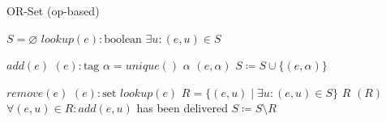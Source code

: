 \begin{algorithm}[t]
\small{
	\caption{OR-Set (op-based)}
 	\label{alg:or_set_op_based}                       

 	\begin{algorithmic}[1]
 	  \State \Payload $S = \varnothing$
 	  \State \Query $lookup(e) : \text{boolean}$
 	  \State \hspace{\algorithmicindent} \Return $\exists u : (e, u) \in S$
 	  
 	  \State \Update $add(e)$
 	  \State \hspace{\algorithmicindent} \Prepare $(e) : \text{tag}$
 	  \State \hspace{\algorithmicindent}\hspace{\algorithmicindent} \Let $\alpha = unique()$
 	  \State \hspace{\algorithmicindent}\hspace{\algorithmicindent} \Return $\alpha$
 	  \State \hspace{\algorithmicindent} \Effect $(e, \alpha)$ 
 	  \State \hspace{\algorithmicindent}\hspace{\algorithmicindent} $S \coloneqq S \cup \{(e, \alpha)\}$
 	  
 	  \State \Update $remove(e)$
 	  \State \hspace{\algorithmicindent} \Prepare $(e) : \text{set}$
 	  \State \hspace{\algorithmicindent}\hspace{\algorithmicindent} \Pre $lookup(e)$
 	  \State \hspace{\algorithmicindent}\hspace{\algorithmicindent} \Let $R = \{(e, u) \mid \exists u : (e, u) \in S\}$
 	  \State \hspace{\algorithmicindent}\hspace{\algorithmicindent} \Return $R$
 	  \State \hspace{\algorithmicindent} \Effect $(R)$ 
 	  \State \hspace{\algorithmicindent}\hspace{\algorithmicindent} \Pre $\forall (e, u) \in R : add(e, u)$ has been delivered
 	  \State \hspace{\algorithmicindent}\hspace{\algorithmicindent} $S \coloneqq S \setminus R$
	\end{algorithmic}
 }
\end{algorithm}

